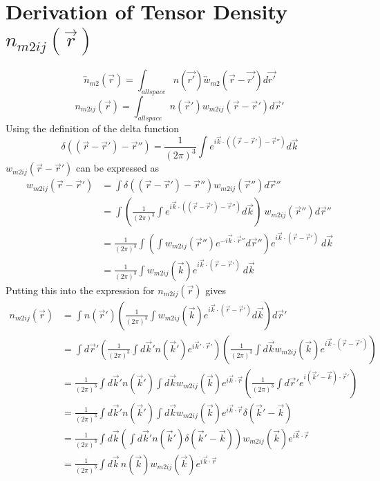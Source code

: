 \documentclass[double,12pt]{beavtex}
\begin{document}
\section{Derivation of Tensor Density $n_{m2ij}(\vec{r})$}
\begin{equation}{\overleftrightarrow{n}_{m2}(\vec{r})=\int_{allspace}n(\vec{r'})\overleftrightarrow{w}_{m2}(\vec{r}-\vec{r'})d{\vec{r'}}}\end{equation} 
\begin{equation}{n_{m2ij}(\vec{r})=\int_{allspace}{n(\vec{r}')w_{m2ij}(\vec{r}-\vec{r}'){}d{\vec{r}'}}}\end{equation}
Using the definition of the delta function
\begin{equation}{\delta}((\vec{r}-\vec{r}')-\vec{r}'')={ \frac{1}{\left(2\pi\right)^3}\int e^{i\vec k\cdot ((\vec r-\vec r')-\vec{r}'')}d\vec{k}}\end{equation} 
$w_{m2ij}(\vec{r}-\vec{r}')$ can be expressed as
\begin{align}
    w_{m2ij}(\vec{r}-\vec{r}') &= \int{\delta((\vec{r}-\vec{r}')-\vec{r}'')w_{m2ij}(\vec{r}''){}d{\vec{r}''}} \\
    &= \int{\left(\frac{1}{\left(2\pi\right)^3}\int e^{i\vec k\cdot((\vec r-\vec r')-\vec{r}'')}d\vec{k}\right){~}w_{m2ij}(\vec{r}''){}d{\vec{r}''}} \\
    &= \frac{1}{\left(2\pi\right)^3}\int{\left(\int w_{m2ij}(\vec{r}'')e^{-i\vec k\cdot\vec{r}''}d\vec{r}''\right)e^{i\vec k\cdot(\vec r-\vec r')}{~}{}d{\vec{k}}} \\
    &= \frac{1}{\left(2\pi\right)^3}\int{w_{m2ij}(\vec k)e^{i\vec k\cdot(\vec r-\vec r')}{~}{}d{\vec{k}}} 
  \end{align} 
Putting this into the expression for $n_{m2ij}(\vec{r})$ gives 
\begin{align}
    n_{m2ij}(\vec r) &= \int n(\vec r') \left(\frac{1}{\left(2\pi\right)^3}\int w_{m2ij}(\vec k)e^{i\vec k\cdot (\vec r-\vec r')}d\vec{k}\right)d\vec r' \\
    &= \int d\vec r' \left(\frac{1}{\left(2\pi\right)^3}\int d\vec k' n(\vec k')e^{i\vec k'\cdot \vec r'}\right) \left(\frac{1}{\left(2\pi\right)^3}\int d\vec k w_{m2ij}(\vec k)e^{i\vec k\cdot (\vec r-\vec r')}\right) \\
    &=  \frac{1}{\left(2\pi\right)^3}\int d\vec k' n(\vec k') \int d\vec k w_{m2ij}(\vec k)
    e^{i\vec k\cdot \vec r}\left(\frac{1}{\left(2\pi\right)^3}\int d\vec r'e^{i(\vec k'-\vec k)\cdot \vec r'}\right)
    \\
    &= \frac{1}{\left(2\pi\right)^3}\int d\vec k' n(\vec k') \int d\vec k w_{m2ij}(\vec k)e^{i\vec k\cdot \vec r}\delta(\vec k'-\vec k) \\
    &= \frac{1}{\left(2\pi\right)^3}\int d\vec k \left(\int d\vec k' n(\vec k')\delta(\vec k'-\vec k)\right) w_{m2ij}(\vec k)e^{i\vec k\cdot \vec r}
    \\
    &= \frac{1}{\left(2\pi\right)^3}\int d\vec k\, n(\vec k) w_{m2ij}(\vec k)e^{i\vec k\cdot \vec r}
  \end{align} 
\end{document}
